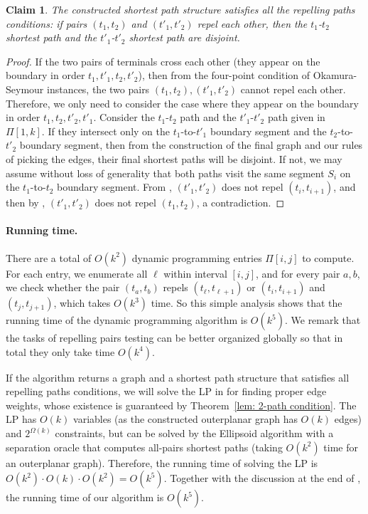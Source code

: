 \documentclass[11pt]{article}
\newtheorem{claim}[theorem]{Claim}
\begin{document}
\begin{claim} \label{clm:repel}
The constructed shortest path structure satisfies all the repelling paths conditions: if pairs $(t_1,t_2)$ and $(t'_1,t'_2)$ repel each other, then the $t_1$-$t_2$ shortest path and the $t'_1$-$t'_2$ shortest path are disjoint.
\end{claim}

\begin{proof}
If the two pairs of terminals cross each other (they appear on the boundary in order $t_1,t'_1,t_2,t'_2$), then from the four-point condition of Okamura-Seymour instances, the two pairs $(t_1,t_2),(t'_1,t'_2)$ cannot repel each other.
Therefore, we only need to consider the case where they appear on the boundary in order $t_1,t_2,t'_2,t'_1$.
Consider the $t_1$-$t_2$ path and the $t'_1$-$t'_2$ path given in $\Pi[1,k]$.
If they intersect only on the $t_1$-to-$t'_1$ boundary segment and the $t_2$-to-$t'_2$ boundary segment, then from the construction of the final graph and our rules of picking the edges, their final shortest paths will be disjoint. If not, we may assume without loss of generality that both paths visit the same segment $S_i$ on the $t_1$-to-$t_2$ boundary segment. From , $(t'_1,t'_2)$ does not repel $(t_i,t_{i+1})$, and then by , $(t'_1,t'_2)$ does not repel $(t_1,t_2)$, a contradiction.
\end{proof}


\paragraph{Running time.} There are a total of $O(k^2)$ dynamic programming entries $\Pi[i,j]$ to compute. For each entry, we enumerate all $\ell$ within interval $[i,j]$, and for every pair $a,b$, we check whether the pair $(t_a,t_b)$ repels $(t_{\ell},t_{\ell+1})$ or $(t_{i},t_{i+1})$ and $(t_{j},t_{j+1})$, which takes $O(k^3)$ time. So this simple analysis shows that the running time of the dynamic programming algorithm is $O(k^5)$. We remark that the tasks of repelling pairs testing can be better organized globally so that in total they only take time $O(k^4)$.

If the algorithm returns a graph and a shortest path structure that satisfies all repelling paths conditions, we will solve the LP in  for finding proper edge weights, whose existence is guaranteed by Theorem~\ref{lem: 2-path condition}. The LP has $O(k)$ variables (as the constructed outerplanar graph has $O(k)$ edges) and $2^{\Omega(k)}$ constraints, but can be solved by the Ellipsoid algorithm with a separation oracle that computes all-pairs shortest paths (taking $O(k^2)$ time for an outerplanar graph). Therefore, the running time of solving the LP is $O(k^2)\cdot O(k)\cdot O(k^2)=O(k^5)$. Together with the discussion at the end of , the running time of our algorithm is $O(k^5)$.
\end{document}
